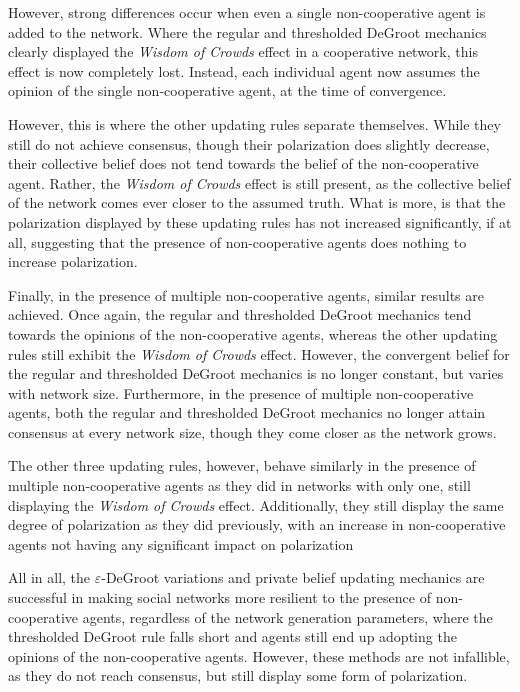 \documentclass[a4paper, 12pt]{report}
\begin{document}
\noindent However, strong differences occur when even a single non-cooperative agent is added to the network. Where the regular and thresholded DeGroot mechanics clearly displayed the \emph{Wisdom of Crowds} effect in a cooperative network, this effect is now completely lost. Instead, each individual agent now assumes the opinion of the single non-cooperative agent, at the time of convergence. 

\noindent However, this is where the other updating rules separate themselves. While they still do not achieve consensus, though their polarization does slightly decrease, their collective belief does not tend towards the belief of the non-cooperative agent. Rather, the \emph{Wisdom of Crowds} effect is still present, as the collective belief of the network comes ever closer to the assumed truth. What is more, is that the polarization displayed by these updating rules has not increased significantly, if at all, suggesting that the presence of non-cooperative agents does nothing to increase polarization.

\noindent Finally, in the presence of multiple non-cooperative agents, similar results are achieved. Once again, the regular and thresholded DeGroot mechanics tend towards the opinions of the non-cooperative agents, whereas the other updating rules still exhibit the \emph{Wisdom of Crowds} effect. However, the convergent belief for the regular and thresholded DeGroot mechanics is no longer constant, but varies with network size. Furthermore, in the presence of multiple non-cooperative agents, both the regular and thresholded DeGroot mechanics no longer attain consensus at every network size, though they come closer as the network grows. 

\noindent The other three updating rules, however, behave similarly in the presence of multiple non-cooperative agents as they did in networks with only one, still displaying the \emph{Wisdom of Crowds} effect. Additionally, they still display the same degree of polarization as they did previously, with an increase in non-cooperative agents not having any significant impact on polarization

\noindent All in all, the $\varepsilon$-DeGroot variations and private belief updating mechanics are successful in making social networks more resilient to the presence of non-cooperative agents, regardless of the network generation parameters, where the thresholded DeGroot rule falls short and agents still end up adopting the opinions of the non-cooperative agents. However, these methods are not infallible, as they do not reach consensus, but still display some form of polarization.
\end{document}
